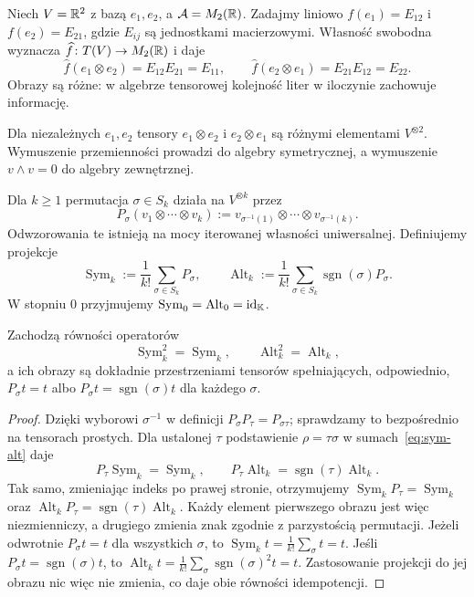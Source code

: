 \begin{przyklad}
Niech $V=\mathbb{R}^2$ z bazą $e_1,e_2$, a
$\mathcal A=M_2(\mathbb{R})$. Zadajmy liniowo
$f(e_1)=E_{12}$ i $f(e_2)=E_{21}$, gdzie $E_{ij}$ są
jednostkami macierzowymi. Własność swobodna wyznacza
$\widehat f\colon T(V)\to M_2(\mathbb{R})$ i daje
\[
 \widehat f(e_1\otimes e_2)=E_{12}E_{21}=E_{11},
 \qquad
 \widehat f(e_2\otimes e_1)=E_{21}E_{12}=E_{22}.
\]
Obrazy są różne: w algebrze tensorowej kolejność liter
w iloczynie zachowuje informację.
\end{przyklad}

Dla niezależnych $e_1,e_2$ tensory $e_1\otimes e_2$ i
$e_2\otimes e_1$ są różnymi elementami $V^{\otimes2}$.
Wymuszenie przemienności prowadzi do algebry symetrycznej,
a wymuszenie $v\wedge v=0$ do algebry zewnętrznej.

\begin{definicja}
\label{def:sym-alt}
Dla $k\geq1$ permutacja $\sigma\in S_k$ działa na
$V^{\otimes k}$ przez
\[
 P_\sigma(v_1\otimes\cdots\otimes v_k)
 :=v_{\sigma^{-1}(1)}\otimes\cdots\otimes v_{\sigma^{-1}(k)}.
\]
Odwzorowania te istnieją na mocy iterowanej własności uniwersalnej.
Definiujemy projekcje
\begin{equation}\label{eq:sym-alt}
 \operatorname{Sym}_k:=\frac1{k!}\sum_{\sigma\in S_k}P_\sigma,
 \qquad
 \operatorname{Alt}_k:=\frac1{k!}\sum_{\sigma\in S_k}
\operatorname{sgn}(\sigma)P_\sigma.
\end{equation}
W stopniu $0$ przyjmujemy
$\operatorname{Sym}_0=\operatorname{Alt}_0=\mathrm{id}_{\mathbb K}$.
\end{definicja}

\begin{twierdzenie}
\label{thm:sym-alt}
 Zachodzą równości operatorów
\[
 \operatorname{Sym}_k^2=\operatorname{Sym}_k,\qquad
 \operatorname{Alt}_k^2=\operatorname{Alt}_k,
\]
a ich obrazy są dokładnie przestrzeniami tensorów spełniających,
odpowiednio, $P_\sigma t=t$ albo
$P_\sigma t=\operatorname{sgn}(\sigma)t$ dla każdego $\sigma$.
\end{twierdzenie}
\begin{proof}
Dzięki wyborowi $\sigma^{-1}$ w definicji
$P_\sigma P_\tau=P_{\sigma\tau}$; sprawdzamy to bezpośrednio
na tensorach prostych. Dla ustalonej $\tau$ podstawienie
$\rho=\tau\sigma$ w sumach~\eqref{eq:sym-alt} daje
\[
 P_\tau\operatorname{Sym}_k=\operatorname{Sym}_k,
 \qquad
 P_\tau\operatorname{Alt}_k
 =\operatorname{sgn}(\tau)\operatorname{Alt}_k.
\]
Tak samo, zmieniając indeks po prawej stronie, otrzymujemy
$\operatorname{Sym}_kP_\tau=\operatorname{Sym}_k$ oraz
$\operatorname{Alt}_kP_\tau=\operatorname{sgn}(\tau)\operatorname{Alt}_k$.
Każdy element pierwszego obrazu jest więc niezmienniczy,
a drugiego zmienia znak zgodnie z parzystością permutacji.
Jeżeli odwrotnie $P_\sigma t=t$ dla wszystkich $\sigma$,
to $\operatorname{Sym}_k t=\frac1{k!}\sum_\sigma t=t$.
Jeśli $P_\sigma t=\operatorname{sgn}(\sigma)t$, to
$\operatorname{Alt}_k t=
\frac1{k!}\sum_\sigma\operatorname{sgn}(\sigma)^2t=t$.
Zastosowanie projekcji do jej obrazu nic więc nie zmienia,
co daje obie równości idempotencji.
\end{proof}

